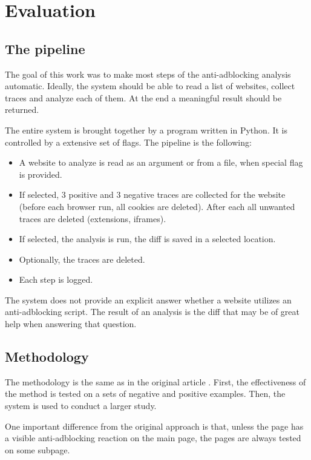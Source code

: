\chapter{Evaluation}
\label{evaluation}

\section{The pipeline}

The goal of this work was to make most steps of the anti-adblocking analysis automatic.
Ideally, the system should be able to read a list of websites, collect traces and analyze
each of them. At the end a meaningful result should be returned.

The entire system is brought together by a program written in Python.
It is controlled by a extensive set of flags.
The pipeline is the following:
\begin{itemize}
  \item A website to analyze is read as an argument or from a file, when special flag is provided.
  \item If selected, 3 positive and 3 negative traces are collected for the website (before each browser run,
           all cookies are deleted). After each all unwanted traces are deleted (extensions, iframes).
  \item If selected, the analysis is run, the diff is saved in a selected location.
  \item Optionally, the traces are deleted.
  \item Each step is logged.
\end{itemize}

The system does not provide an explicit answer whether a website utilizes an anti-adblocking script.
The result of an analysis is the diff that may be of great help when answering that question.

\section{Methodology}
\label{methodology}

The methodology is the same as in the original article \cite{DBLP:conf/ndss/ZhuHQSY18}.
First, the effectiveness of the method is tested on a sets of negative and positive examples.
Then, the system is used to conduct a larger study.

One important difference from the original approach is that, unless the page has a visible anti-adblocking
reaction on the main page, the pages are always tested on some subpage.

